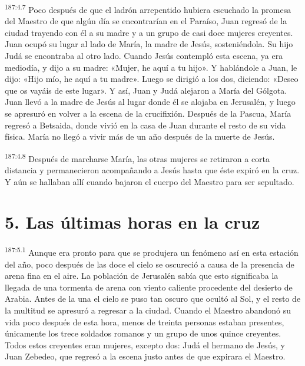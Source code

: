\par 
\textsuperscript{187:4.7} Poco después de que el ladrón arrepentido hubiera escuchado la promesa del Maestro de que algún día se encontrarían en el Paraíso, Juan regresó de la ciudad trayendo con él a su madre y a un grupo de casi doce mujeres creyentes. Juan ocupó su lugar al lado de María, la madre de Jesús, sosteniéndola. Su hijo Judá se encontraba al otro lado. Cuando Jesús contempló esta escena, ya era mediodía, y dijo a su madre: «Mujer, he aquí a tu hijo». Y hablándole a Juan, le dijo: «Hijo mío, he aquí a tu madre». Luego se dirigió a los dos, diciendo: «Deseo que os vayáis de este lugar». Y así, Juan y Judá alejaron a María del Gólgota. Juan llevó a la madre de Jesús al lugar donde él se alojaba en Jerusalén, y luego se apresuró en volver a la escena de la crucifixión. Después de la Pascua, María regresó a Betsaida, donde vivió en la casa de Juan durante el resto de su vida física. María no llegó a vivir más de un año después de la muerte de Jesús.

\par 
\textsuperscript{187:4.8} Después de marcharse María, las otras mujeres se retiraron a corta distancia y permanecieron acompañando a Jesús hasta que éste expiró en la cruz. Y aún se hallaban allí cuando bajaron el cuerpo del Maestro para ser sepultado.

\section*{5. Las últimas horas en la cruz}
\par 
\textsuperscript{187:5.1} Aunque era pronto para que se produjera un fenómeno así en esta estación del año, poco después de las doce el cielo se oscureció a causa de la presencia de arena fina en el aire. La población de Jerusalén sabía que esto significaba la llegada de una tormenta de arena con viento caliente procedente del desierto de Arabia. Antes de la una el cielo se puso tan oscuro que ocultó al Sol, y el resto de la multitud se apresuró a regresar a la ciudad. Cuando el Maestro abandonó su vida poco después de esta hora, menos de treinta personas estaban presentes, únicamente los trece soldados romanos y un grupo de unos quince creyentes. Todos estos creyentes eran mujeres, excepto dos: Judá el hermano de Jesús, y Juan Zebedeo, que regresó a la escena justo antes de que expirara el Maestro.

